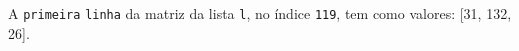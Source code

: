 \documentclass[12pt,varwidth=16cm,border=1pt]{standalone}
\begin{document}
A \verb+primeira+ \verb+linha+ da matriz da lista \verb+l+, no índice \verb+119+, tem como valores: [31, 132, 26].

\questiomtrue
\end{document}
